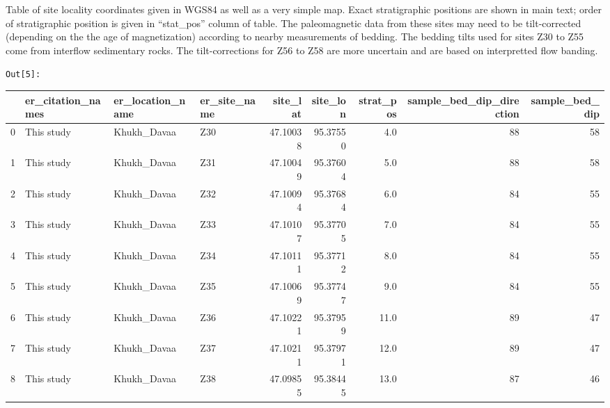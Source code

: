 \documentclass[11pt]{article}
\begin{document}
    Table of site locality coordinates given in WGS84 as well as a very
simple map. Exact stratigraphic positions are shown in main text; order
of stratigraphic position is given in ``stat\_pos'' column of table. The
paleomagnetic data from these sites may need to be tilt-corrected
(depending on the the age of magnetization) according to nearby
measurements of bedding. The bedding tilts used for sites Z30 to Z55
come from interflow sedimentary rocks. The tilt-corrections for Z56 to
Z58 are more uncertain and are based on interpretted flow banding.

\texttt{\color{outcolor}Out[{\color{outcolor}5}]:}
    
{\tiny\begin{tabular}{llllrrrrr}
\toprule
{} & er\_citation\_names & er\_location\_name & er\_site\_name &  site\_lat &  site\_lon &  strat\_pos &  sample\_bed\_dip\_direction &  sample\_bed\_dip \\
\midrule
0  &        This study &     Khukh\_Davaa  &          Z30 &  47.10038 &  95.37550 &        4.0 &                        88 &              58 \\
1  &        This study &     Khukh\_Davaa  &          Z31 &  47.10049 &  95.37604 &        5.0 &                        88 &              58 \\
2  &        This study &     Khukh\_Davaa  &          Z32 &  47.10094 &  95.37684 &        6.0 &                        84 &              55 \\
3  &        This study &     Khukh\_Davaa  &          Z33 &  47.10107 &  95.37705 &        7.0 &                        84 &              55 \\
4  &        This study &     Khukh\_Davaa  &          Z34 &  47.10111 &  95.37712 &        8.0 &                        84 &              55 \\
5  &        This study &     Khukh\_Davaa  &          Z35 &  47.10069 &  95.37747 &        9.0 &                        84 &              55 \\
6  &        This study &     Khukh\_Davaa  &          Z36 &  47.10221 &  95.37959 &       11.0 &                        89 &              47 \\
7  &        This study &     Khukh\_Davaa  &          Z37 &  47.10211 &  95.37971 &       12.0 &                        89 &              47 \\
8  &        This study &     Khukh\_Davaa  &          Z38 &  47.09855 &  95.38445 &       13.0 &                        87 &              46 \\

\end{tabular}}
\end{document}
